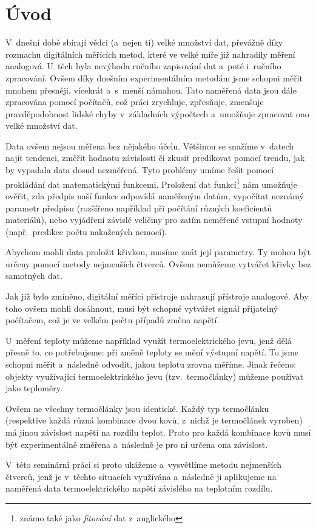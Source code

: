 \section{Úvod}
V~dnešní době sbírají vědci (a~nejen ti) velké množství dat, převážně díky
rozmachu digitálních měřících metod, které ve velké míře již nahradily měření
analogová. U~těch byla nevýhoda ručního zapisování dat a~poté i~ručního
zpracování. Ovšem díky dnešním experimentálním metodám jsme schopni měřit
mnohem přesněji, vícekrát a~s~menší námahou. Tato naměřená data jsou dále
zpracována pomocí počítačů, což práci zrychluje, zpřesňuje, zmenšuje
pravděpodobnost lidské chyby v~základních výpočtech a~umožňuje zpracovat ono
velké množství dat.

Data ovšem nejsou měřena bez nějakého účelu. Většinou se snažíme v~datech najít
tendenci, změřit hodnotu závislosti či zkusit predikovat pomocí trendu,
jak by vypadala data dosud nezměřená. Tyto problémy umíme řešit pomocí
prokládání dat matematickými funkcemi. Proložení dat funkcí\footnote{známo také
jako \emph{fitování} dat z~anglického } nám umožňuje ověřit, zda
předpis naší funkce odpovídá naměřeným datům, vypočítat neznámý parametr
předpisu (rozšířeno například při počítání různých koeficientů materiálů), nebo
vyjádření závislé veličiny pro zatím neměřené vstupní hodnoty (např.~predikce
počtu nakažených nemocí).

Abychom mohli data proložit křivkou, musíme znát její parametry. Ty mohou být
určeny pomocí metody nejmenších čtverců. Ovšem nemůžeme vytvářet křivky bez
samotných dat.

Jak již bylo zmíněno, digitální měřící přístroje nahrazují přístroje analogové.
Aby toho ovšem mohli dosáhnout, musí být schopné vytvářet signál přijatelný
počítačem, což je ve velkém počtu případů změna napětí. 

U~měření teploty můžeme například využít termoelektrického jevu, jenž dělá
přesně to, co potřebujeme: při změně teploty se mění výstupní napětí. To jsme
schopni měřit a~následně odvodit, jakou teplotu zrovna měříme. Jinak řečeno:
objekty využívající termoelektrického jevu (tzv.~termočlánky) můžeme používat
jako teploměry.

Ovšem ne všechny termočlánky jsou identické. Každý typ termočlánku (respektive
každá různá kombinace dvou kovů, z~nichž je termočlánek vyroben) má jinou
závislost napětí na rozdílu teplot. Proto pro každá kombinace kovů musí být
experimentálně změřena a~následně je pro ni určena ona závislost.

V~této seminární práci si proto ukážeme a~vysvětlíme metodu nejmenších čtverců,
jenž je v~těchto situacích využívána a~následně ji aplikujeme na naměřená data
termoelektrického napětí závislého na teplotním rozdílu.
